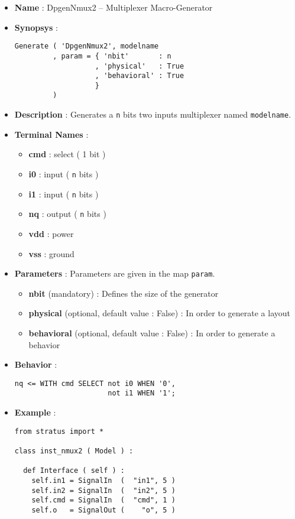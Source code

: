 \begin{itemize}
    \item \textbf{Name} : DpgenNmux2 -- Multiplexer Macro-Generator
    \item \textbf{Synopsys} :
\begin{verbatim}
Generate ( 'DpgenNmux2', modelname
         , param = { 'nbit'       : n
                   , 'physical'   : True
                   , 'behavioral' : True         
                   }
         )
\end{verbatim}
    \item \textbf{Description} : Generates a \verb-n- bits two inputs multiplexer named \verb-modelname-.
    \item \textbf{Terminal Names} :
    \begin{itemize}
        \item \textbf{cmd} : select ( 1 bit )
        \item \textbf{i0} : input ( \verb-n- bits )
        \item \textbf{i1} : input ( \verb-n- bits )
        \item \textbf{nq} : output ( \verb-n- bits )
        \item \textbf{vdd} : power
        \item \textbf{vss} : ground
    \end{itemize}
    \item \textbf{Parameters} : Parameters are given in the map \verb-param-.
    \begin{itemize}
        \item \textbf{nbit} (mandatory) : Defines the size of the generator
        \item \textbf{physical} (optional, default value : False) : In order to generate a layout
        \item \textbf{behavioral} (optional, default value : False) : In order to generate a behavior
    \end{itemize}
    \item \textbf{Behavior} :
\begin{verbatim}
nq <= WITH cmd SELECT not i0 WHEN '0',
                      not i1 WHEN '1';
\end{verbatim}
    \item \textbf{Example} :
\begin{verbatim}
from stratus import *

class inst_nmux2 ( Model ) :

  def Interface ( self ) :
    self.in1 = SignalIn  (  "in1", 5 )
    self.in2 = SignalIn  (  "in2", 5 )
    self.cmd = SignalIn  (  "cmd", 1 )
    self.o   = SignalOut (    "o", 5 )


\end{verbatim}
\end{itemize}
